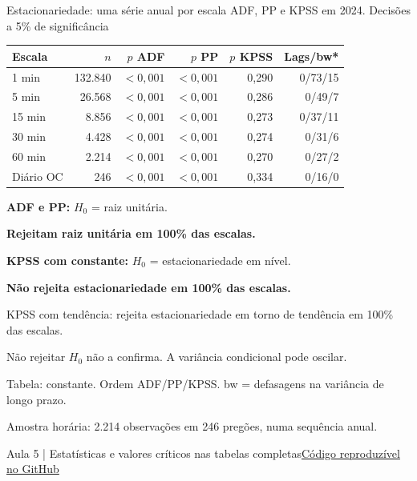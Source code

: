 \documentclass[aspectratio=169,10pt]{beamer}
\newcommand{\source}[2]{\par\vfill{\raggedright\tiny\color{muted}#1\quad\href{#2}{Código reproduzível no GitHub}\par}}
\newcommand{\tagline}[1]{{\small\color{teal}#1}\par\medskip}
\begin{document}
\begin{frame}[t]{Estacionariedade: uma série anual por escala}
\tagline{ADF, PP e KPSS em 2024. Decisões a 5\% de significância}
\centering\small\begin{tabular}{lrrrrr}
\toprule
Escala & $n$ & $p$ ADF & $p$ PP & $p$ KPSS & Lags/bw* \\ \midrule
1 min & 132.840 & $<0{,}001$ & $<0{,}001$ & 0,290 & 0/73/15 \\
5 min & 26.568 & $<0{,}001$ & $<0{,}001$ & 0,286 & 0/49/7 \\
15 min & 8.856 & $<0{,}001$ & $<0{,}001$ & 0,273 & 0/37/11 \\
30 min & 4.428 & $<0{,}001$ & $<0{,}001$ & 0,274 & 0/31/6 \\
60 min & 2.214 & $<0{,}001$ & $<0{,}001$ & 0,270 & 0/27/2 \\
Diário OC & 246 & $<0{,}001$ & $<0{,}001$ & 0,334 & 0/16/0 \\
\bottomrule
\end{tabular}\par
\raggedright\medskip\small\textbf{ADF e PP:} $H_0$ = raiz unitária.\par \textbf{Rejeitam raiz unitária em 100\% das escalas.}\par\smallskip \textbf{KPSS com constante:} $H_0$ = estacionariedade em nível.\par \textbf{Não rejeita estacionariedade em 100\% das escalas.}\par\smallskip \scriptsize\alert{KPSS com tendência: rejeita estacionariedade em torno de tendência em 100\% das escalas.}\par Não rejeitar $H_0$ não a confirma. A variância condicional pode oscilar.\par\smallskip *Tabela: constante. Ordem ADF/PP/KPSS. bw = defasagens na variância de longo prazo.\par Amostra horária: 2.214 observações em 246 pregões, numa sequência anual.
\source{Aula 5 | Estatísticas e valores críticos nas tabelas completas}{https://github.com/avilarenan/EAD6034/blob/1782cade2ed752ce6b7c1b8b10c316445aef2626/src/ead6034/annual_models.py}
\end{frame}
\end{document}
